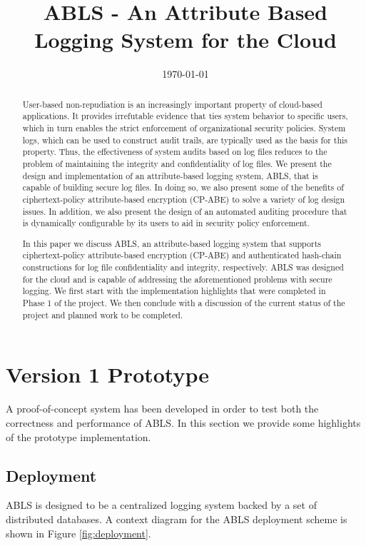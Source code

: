 \documentclass{sig-alternate}
\begin{document}
\title{ABLS - An Attribute Based Logging System for the Cloud}
\author{
}
\date{\today}
\maketitle
\begin{abstract}
User-based non-repudiation is an increasingly important property of cloud-based applications. It provides irrefutable evidence that ties system behavior to specific users, which in turn enables the strict enforcement of organizational security policies. System logs, which can be used to construct audit trails, are typically used as the basis for this property. Thus, the effectiveness of system audits based on log files reduces to the problem of maintaining the integrity and confidentiality of log files. We present the design and implementation of an attribute-based logging system, ABLS, that is capable of building secure log files. In doing so, we also present some of the benefits of ciphertext-policy attribute-based encryption (CP-ABE) to solve a variety of log design issues. In addition, we also present the design of an automated auditing procedure
that is dynamically configurable by its users to aid in security policy enforcement.

In this paper we discuss ABLS, an attribute-based logging system that supports ciphertext-policy 
attribute-based encryption (CP-ABE) \cite{Bethencourt2007-CPABE} and authenticated hash-chain 
constructions for log file confidentiality and integrity, respectively. ABLS was designed for
the cloud and is capable of addressing the aforementioned problems with secure logging. 
We first start with the implementation highlights that were completed in Phase 1 of the project. We then
conclude with a discussion of the current status of the project and planned work to be completed.
\end{abstract}

\section{Version 1 Prototype}
A proof-of-concept system has been developed in order to test both the correctness and performance of ABLS. 
In this section we provide some highlights of the prototype implementation.

\subsection{Deployment}
\label{sec:deployment}
ABLS is designed to be a centralized logging system backed by a set of distributed databases. A context
diagram for the ABLS deployment scheme is shown in Figure \ref{fig:deployment}.
\end{document}
